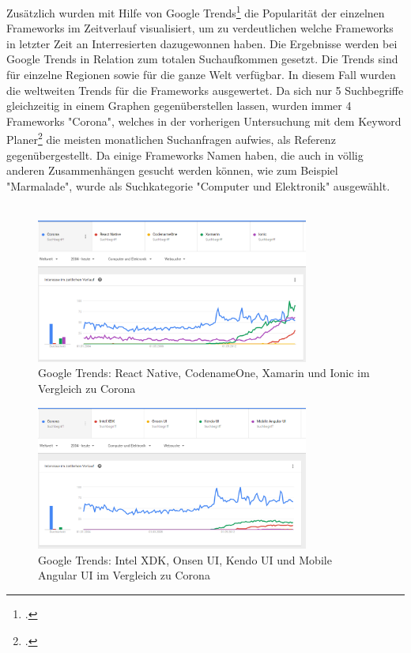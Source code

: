 \clearpage
Zusätzlich wurden mit Hilfe von Google Trends\footcite{GoogleTrends} die Popularität der einzelnen Frameworks im Zeitverlauf visualisiert, um zu verdeutlichen welche Frameworks in letzter Zeit an Interresierten dazugewonnen haben. Die Ergebnisse werden bei Google Trends in Relation zum totalen Suchaufkommen gesetzt. Die Trends sind für einzelne Regionen sowie für die ganze Welt verfügbar. In diesem Fall wurden die weltweiten Trends für die Frameworks ausgewertet. Da sich nur 5 Suchbegriffe gleichzeitig in einem Graphen gegenüberstellen lassen, wurden immer 4 Frameworks "Corona", welches in der vorherigen Untersuchung mit dem Keyword Planer\footcite{KeyWordPlaner} die meisten monatlichen Suchanfragen aufwies, als Referenz gegenübergestellt. Da einige Frameworks Namen haben, die auch in völlig anderen Zusammenhängen gesucht werden können, wie zum Beispiel "Marmalade", wurde als Suchkategorie "Computer und Elektronik" ausgewählt.
\\
\\
\begin{figure}[h]
	\centering
	\includegraphics[width=0.8\textwidth]{Bilder/trends_1.PNG}
	\caption{Google Trends: React Native, CodenameOne, Xamarin und Ionic im Vergleich zu Corona}
	\label{fig:Trends1}
\end{figure}
\begin{figure}[h]
	\centering
	\includegraphics[width=0.8\textwidth]{Bilder/trends_2.PNG}
	\caption{Google Trends: Intel XDK, Onsen UI, Kendo UI und Mobile Angular UI im Vergleich zu Corona}
	\label{fig:Trends2}
\end{figure}
